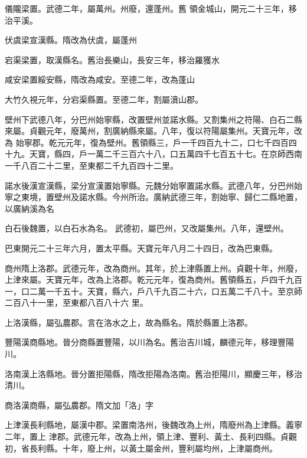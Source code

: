 \begin{pinyinscope}
 儀隴梁置。武德二年，屬萬州。州廢，還蓬州。舊
 領金城山，開元二十三年，移治平溪。



 伏虞梁宣漢縣。隋改為伏虞，屬蓬州



 宕渠梁置，取漢縣名。舊治長樂山，長安三年，移治羅獲水



 咸安梁置綏安縣，隋改為咸安。至德二年，改為蓬山



 大竹久視元年，分宕渠縣置。至德二年，割屬濆山郡。



 壁州下武德八年，分巴州始寧縣，改置壁州並諾水縣。又割集州之符陽、白石二縣來屬。貞觀元年，廢萬州，割廣納縣來屬。八年，復以符陽屬集州。天寶元年，改為
 始寧郡。乾元元年，復為壁州。舊領縣三，戶一千四百九十二，口七千四百四十九。天寶，縣四，戶一萬二千三百六十八，口五萬四千七百五十七。在京師西南一千八百二十二里，至東都二千九百四十二里。



 諾水後漢宣漢縣，梁分宣漢置始寧縣。元魏分始寧置諾水縣。武德八年，分巴州始寧之東境，置壁州及諾水縣。今州所治。廣納武德三年，割始寧、歸仁二縣地置，以廣納溪為名



 白石後魏置，以白石水為名。
 武德初，屬巴州，又改屬集州。八年，還壁州。



 巴東開元二十三年六月，置太平縣。天寶元年八月二十四日，改為巴東縣。



 商州隋上洛郡。武德元年，改為商州。其年，於上津縣置上州。貞觀十年，州廢，上津來屬。天寶元年，改為上洛郡。乾元元年，復為商州。舊領縣五，戶四千九百一，口二萬一千五十。天寶，縣六，戶八千九百二十六，口五萬二千八十。至京師二百八十一里，至東都八百八十六
 里。



 上洛漢縣，屬弘農郡。言在洛水之上，故為縣名。隋於縣置上洛郡。



 豐陽漢商縣地。晉分商縣置豐陽，以川為名。舊治吉川城，麟德元年，移理豐陽川。



 洛南漢上洛縣地。晉分置拒陽縣，隋改拒陽為洛南。舊治拒陽川，顯慶三年，移治清川。



 商洛漢商縣，屬弘農郡。隋文加「洛」字



 上津漢長利縣地，屬漢中郡。梁置南洛州，後魏改為上州，隋廢州為上津縣。義寧二年，置上
 津郡。武德元年，改為上州，領上津、豐利、黃土、長利四縣。貞觀初，省長利縣。十年，廢上州，以黃土屬金州，豐利屬均州，上津屬商州。




\end{pinyinscope}
